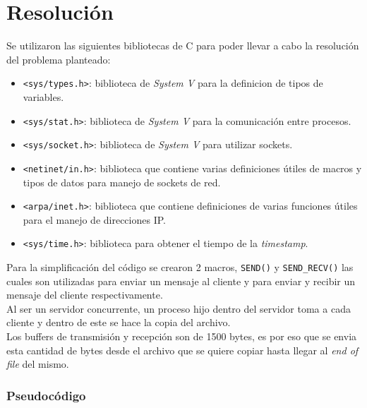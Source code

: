 \section{Resolución}

Se utilizaron las siguientes bibliotecas de C para poder llevar a cabo la resolución del problema planteado:
\begin{itemize}
    \item \texttt{<sys/types.h>}: biblioteca de \textit{System V} para la definicion de tipos de variables.
    \item \texttt{<sys/stat.h>}: biblioteca de \textit{System V} para la comunicación entre procesos.
    \item \texttt{<sys/socket.h>}: biblioteca de \textit{System V} para utilizar sockets.
    \item \texttt{<netinet/in.h>}: biblioteca que contiene varias definiciones útiles de macros y tipos de datos para manejo de sockets de red.
    \item \texttt{<arpa/inet.h>}: biblioteca que contiene definiciones de varias funciones útiles para el manejo de direcciones IP.
    \item \texttt{<sys/time.h>}: biblioteca para obtener el tiempo de la \textit{timestamp}.
\end{itemize}

Para la simplificación del código se crearon 2 macros, \texttt{SEND()} y \texttt{SEND\_RECV()} las cuales son utilizadas para enviar un mensaje al cliente y para enviar y recibir un mensaje del cliente respectivamente.\\

Al ser un servidor concurrente, un proceso hijo dentro del servidor toma a cada cliente y dentro de este se hace la copia del archivo.\\

Los buffers de transmisión y recepción son de 1500 bytes, es por eso que se envia esta cantidad de bytes desde el archivo que se quiere copiar hasta llegar al \textit{end of file} del mismo.\\

\subsubsection{Pseudocódigo}

